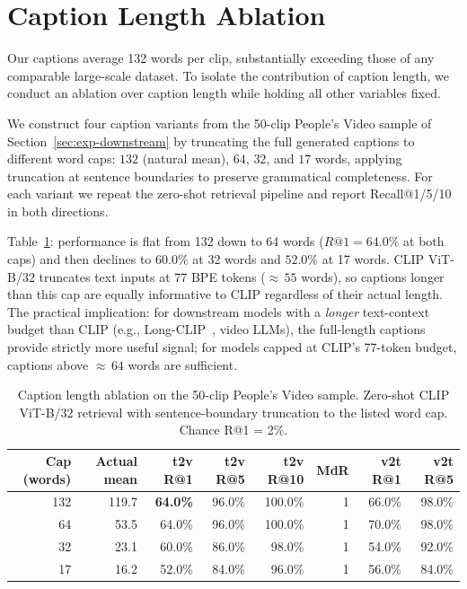 \documentclass{article}
\begin{document}
\section{Caption Length Ablation}
\label{app:ablation}

Our captions average 132 words per clip, substantially exceeding those of any comparable large-scale dataset. To isolate the contribution of caption length, we conduct an ablation over caption length while holding all other variables fixed.

We construct four caption variants from the 50-clip People's Video sample of Section~\ref{sec:exp-downstream} by truncating the full generated captions to different word caps: $132$ (natural mean), $64$, $32$, and $17$ words, applying truncation at sentence boundaries to preserve grammatical completeness. For each variant we repeat the zero-shot retrieval pipeline and report Recall@1/5/10 in both directions.

Table~\ref{tab:caption_length_ablation}: performance is flat from 132 down to 64 words ($R@1 = 64.0\%$ at both caps) and then declines to $60.0\%$ at 32 words and $52.0\%$ at 17 words. CLIP ViT-B/32 truncates text inputs at 77 BPE tokens (${\approx}\,55$ words), so captions longer than this cap are equally informative to CLIP regardless of their actual length. The practical implication: for downstream models with a \emph{longer} text-context budget than CLIP (e.g., Long-CLIP~\cite{zhang2024longclip}, video LLMs), the full-length captions provide strictly more useful signal; for models capped at CLIP's 77-token budget, captions above ${\approx}\,64$ words are sufficient.

\begin{table}[t]
\centering
\caption{Caption length ablation on the 50-clip People's Video sample. Zero-shot CLIP ViT-B/32 retrieval with sentence-boundary truncation to the listed word cap. Chance R@1 = 2\%.}
\label{tab:caption_length_ablation}
\begin{tabular}{rrrrrrrr}
\toprule
Cap (words) & Actual mean & t2v R@1 & t2v R@5 & t2v R@10 & MdR & v2t R@1 & v2t R@5 \\
\midrule
132 & 119.7 & \textbf{64.0\%} & 96.0\% & 100.0\% & 1 & 66.0\% & 98.0\% \\
 64 &  53.5 & 64.0\%          & 96.0\% & 100.0\% & 1 & 70.0\% & 98.0\% \\
 32 &  23.1 & 60.0\%          & 86.0\% & \phantom{0}98.0\% & 1 & 54.0\% & 92.0\% \\
 17 &  16.2 & 52.0\%          & 84.0\% & \phantom{0}96.0\% & 1 & 56.0\% & 84.0\% \\
\bottomrule
\end{tabular}
\end{table}
\end{document}
